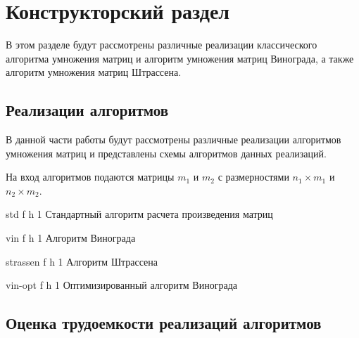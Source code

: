 \chapter{Конструкторский раздел}



В этом разделе будут рассмотрены различные реализации классического алгоритма умножения матриц и алгоритм умножения матриц
Винограда, а также алгоритм умножения матриц Штрассена.


\section{Реализации алгоритмов}

В данной части работы будут рассмотрены различные реализации алгоритмов
умножения матриц и представлены схемы алгоритмов данных реализаций.

На вход алгоритмов подаются матрицы $m_{1}$ и $m_{2}$ с размерностями $n_{1}\times m_{1}$ и $n_{2}\times m_{2}$.



{std} %
{f} %
{h} %
{1\textwidth} %
{Стандартный алгоритм расчета произведения матриц} %

{vin} %
{f} %
{h} %
{1\textwidth} %
{Алгоритм Винограда} %

{strassen} %
{f} %
{h} %
{1\textwidth} %
{Алгоритм Штрассена} %

{vin-opt} %
{f} %
{h} %
{1\textwidth} %
{Оптимизированный алгоритм Винограда} %




\section{Оценка трудоемкости реализаций алгоритмов}

